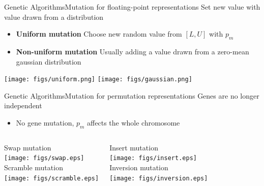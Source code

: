 \documentclass[10pt,compress]{beamer} %
\begin{document}
\begin{frame}{Genetic Algorithms}{Mutation for floating-point representations}
	Set new value with value drawn from a distribution
	\begin{itemize}
		\item \textbf{Uniform mutation} Choose new random value from $[L, U]$ with $p_m$
		\item \textbf{Non-uniform mutation} Usually adding a value drawn from a zero-mean gaussian  distribution
	\end{itemize}
	\begin{center}
	\texttt{[image: figs/uniform.png]}
	\texttt{[image: figs/gaussian.png]}
	\end{center}
\end{frame}

\begin{frame}{Genetic Algorithms}{Mutation for permutation representations}
	Genes are no longer independent
	\begin{itemize}
		\item No gene mutation, $p_m$ affects the whole chromosome
	\end{itemize}
    \begin{columns}
		\begin{center}
		Swap mutation\\
		\texttt{[image: figs/swap.eps]}\\
		Scramble mutation\\
		\texttt{[image: figs/scramble.eps]}\\
		\end{center}
		\begin{center}
		Insert mutation\\
		\texttt{[image: figs/insert.eps]}\\
		Inversion mutation\\
		\texttt{[image: figs/inversion.eps]}\\
		\end{center}
	   \end{columns}
\end{frame}
\end{document}
